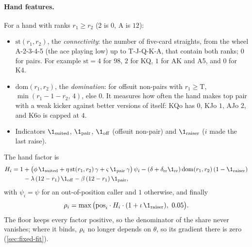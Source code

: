 \paragraph{Hand features.} For a hand with ranks $r_1 \ge r_2$ (2 is $0$, A is $12$):
\begin{itemize}
  \item $\mathrm{st}(r_1,r_2)$, the \emph{connectivity}: the number of five-card straights, from the wheel A-2-3-4-5 (the ace playing low) up to T-J-Q-K-A, that contain both ranks; $0$ for pairs. For example $\mathrm{st} = 4$ for 98, $2$ for KQ, $1$ for AK and A5, and $0$ for K4.
  \item $\mathrm{dom}(r_1,r_2)$, the \emph{domination}: for offsuit non-pairs with $r_1 \ge \mathrm{T}$, $\min(r_1 - 1 - r_2,\, 4)$, else $0$. It measures how often the hand makes top pair with a weak kicker against better versions of itself: KQo has $0$, KJo $1$, AJo $2$, and K6o is capped at $4$.
  \item Indicators $\1_{\mathrm{suited}}$, $\1_{\mathrm{pair}}$, $\1_{\mathrm{off}}$ (offsuit non-pair) and $\1_{\mathrm{raiser}}$ ($i$ made the last raise).
\end{itemize}
The hand factor is
\begin{equation}\label{eq:handfactor}
\begin{aligned}
  H_i = 1 &+ \big(\phi\,\1_{\mathrm{suited}} + \eta\,\mathrm{st}(r_1,r_2)\,\gamma + \varsigma\,\1_{\mathrm{pair}}\,\gamma\big)\,\psi_i
        - (\delta + \delta_{\mathrm{rr}}\1_{\mathrm{rr}})\,\mathrm{dom}(r_1,r_2)\,(1-\1_{\mathrm{raiser}}) \\
        &- \lambda\,(12 - r_1)\,\1_{\mathrm{off}} - \beta\,(12 - r_1)\,\1_{\mathrm{pair}},
\end{aligned}
\end{equation}
with $\psi_i = \psi$ for an out-of-position caller and $1$ otherwise, and finally
\begin{equation}\label{eq:realization}
  \real_i = \max\big(\mathrm{pos}_i \cdot H_i \cdot (1 + \iota\,\1_{\mathrm{raiser}}),\ 0.05\big).
\end{equation}
The floor keeps every factor positive, so the denominator of the share never vanishes; where it binds, $\rho_i$ no longer depends on $\theta$, so its gradient there is zero (\cref{sec:fixed-fit}).

